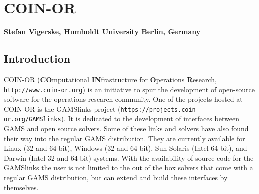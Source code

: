 \renewenvironment{option_tabular}%
{\begin{tabular}{p{.16\textwidth}p{.65\textwidth}p{.11\textwidth}}
\hline
\textbf{Option}      &
\textbf{Description} &
\textbf{Default}     \\
\hline}
{\end{tabular}}

\renewenvironment{tab_list}[1]%
{\begin{list}{}{\vspace*{-1.5ex}\renewcommand{\makelabel}{\desclabel}\parsep-0.15cm\labelwidth#1\leftmargin#1\setlength{\labelsep}{\itemindent}\topsep0cm\parskip0cm\partopsep0cm}}%
{\end{list}}


\chapter{COIN-OR}
\textbf{Stefan Vigerske, Humboldt University Berlin, Germany}
\vspace{1cm}

\minitoc


\section{Introduction}

COIN-OR (\textbf{CO}mputational \textbf{IN}frastructure for \textbf{O}perations \textbf{R}esearch, \texttt{http://www.coin-or.org}) is an initiative to spur the development of open-source software for the operations research community.
One of the projects hosted at COIN-OR is the GAMSlinks project (\texttt{https://projects.coin-or.org/GAMSlinks}).
It is dedicated to the development of interfaces between GAMS and open source solvers.
Some of these links and solvers have also found their way into the regular GAMS distribution.
They are currently available for Linux (32 and 64 bit), Windows (32 and 64 bit), Sun Solaris (Intel 64 bit), and Darwin (Intel 32 and 64 bit) systems.
With the availability of source code for the GAMSlinks the user is not limited to the out of the box solvers that come with a regular GAMS distribution, but can extend and build these interfaces by themselves.

